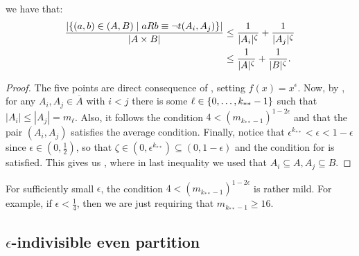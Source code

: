 \begin{lemma}
\begin{enumerate}[label={\Roman*}., ref={\Roman*}, font=\rmfamily]
                    we have that:
                    \[
                        \begin{split}
                            \frac{|\{ (a,b) \in (A,B) \mid a R b \equiv \neg t(A_i,A_j) \}|}{|A \times B|}
                                &\leq \frac{1}{|A_i|^\zeta} + \frac{1}{|A_j|^\zeta} \\
                                &\leq \frac{1}{|A|^\zeta} + \frac{1}{|B|^\zeta}.
                        \end{split}
                    \]
            \end{enumerate}
            \begin{proof}
                The five points are direct consequence of ,
                setting $f(x) = x^\epsilon$.
                Now, by , for any $A_i, A_j \in \overline{A}$ with $i < j$
                there is some $\ell \in \{ 0, \dots, k_{**}-1 \}$ such that $|A_i| \leq |A_j| = m_\ell$.
                Also, it follows the condition $4 < (m_{k_{**}-1})^{1-2\epsilon}$ and 
                that the pair $(A_i,A_j)$ satisfies the average condition.
                Finally, notice that $\epsilon^{k_{**}} < \epsilon < 1 - \epsilon$ since $\epsilon \in (0, \frac{1}{2})$,
                so that $\zeta \in (0, \epsilon ^ {k_{**}}) \subseteq (0, 1 - \epsilon)$ and the condition for
                 is satisfied.
                This gives us ,
                where in last inequality we used that $A_i\subseteq A, A_j\subseteq B$.
            \end{proof}
        \end{lemma}

        \begin{remark}
            For sufficiently small $\epsilon$, the condition $4 < (m_{k_{**}-1})^{1-2\epsilon}$ is rather mild.
            For example, if $\epsilon < \frac{1}{4}$, then we are just requiring that $m_{k_{**}-1} \geq 16$.
        \end{remark}

    \subsection{$\epsilon$-indivisible even partition} \label{subsec:subsection_4.2}


